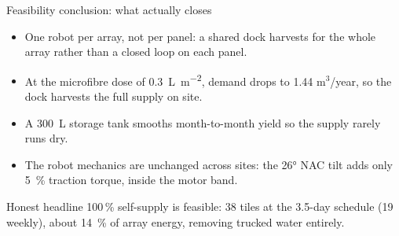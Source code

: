 \documentclass[aspectratio=169,10pt]{beamer}
\begin{document}
\begin{frame}{Feasibility conclusion: what actually closes}
  \begin{itemize}\setlength\itemsep{0.45em}
    \item One robot per array, not per panel: a shared dock harvests for the whole array rather than a closed loop on each panel.
    \item At the microfibre dose of \SI{0.3}{\liter\per\square\meter}, demand drops to \SI{1.44}{} m$^3$/year, so the dock harvests the full supply on site.
    \item A \SI{300}{\liter} storage tank smooths month-to-month yield so the supply rarely runs dry.
    \item The robot mechanics are unchanged across sites: the \ang{26} NAC tilt adds only \SI{5}{\percent} traction torque, inside the motor band.
  \end{itemize}
  \vspace{0.3em}
  \begin{block}{Honest headline}
    100\,\% self-supply is feasible: 38 tiles at the 3.5-day schedule (19 weekly), about \SI{14}{\percent} of array energy, removing trucked water entirely.
  \end{block}
\end{frame}
\end{document}
